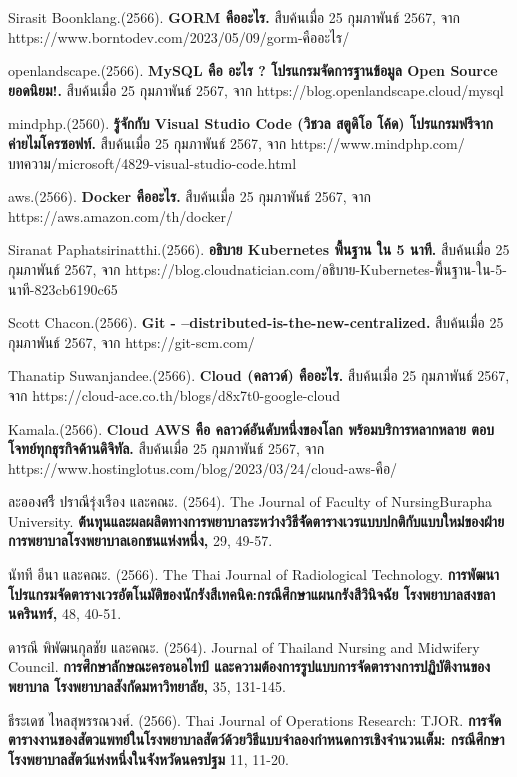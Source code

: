 \begin{thebibliography}{99}
Sirasit Boonklang.(2566). \textbf{GORM คืออะไร.} สืบค้นเมื่อ 25 กุมภาพันธ์ 2567, จาก https://www.borntodev.com/2023/05/09/gorm-คืออะไร/

openlandscape.(2566). \textbf{MySQL คือ อะไร ? โปรแกรมจัดการฐานข้อมูล Open Source ยอดนิยม!.} สืบค้นเมื่อ 25 กุมภาพันธ์ 2567, จาก https://blog.openlandscape.cloud/mysql


mindphp.(2560). \textbf{รู้จักกับ Visual Studio Code (วิชวล สตูดิโอ โค้ด) โปรแกรมฟรีจากค่ายไมโครซอฟท์.} สืบค้นเมื่อ 25 กุมภาพันธ์ 2567, จาก https://www.mindphp.com/บทความ/microsoft/4829-visual-studio-code.html

aws.(2566). \textbf{Docker คืออะไร.} สืบค้นเมื่อ 25 กุมภาพันธ์ 2567, จาก https://aws.amazon.com/th/docker/

Siranat Paphatsirinatthi.(2566). \textbf{อธิบาย Kubernetes พื้นฐาน ใน 5 นาที.} สืบค้นเมื่อ 25 กุมภาพันธ์ 2567, จาก https://blog.cloudnatician.com/อธิบาย-Kubernetes-พื้นฐาน-ใน-5-นาที-823cb6190c65

Scott Chacon.(2566). \textbf{Git - --distributed-is-the-new-centralized.} สืบค้นเมื่อ 25 กุมภาพันธ์ 2567, จาก https://git-scm.com/

Thanatip Suwanjandee.(2566). \textbf{Cloud (คลาวด์) คืออะไร.} สืบค้นเมื่อ 25 กุมภาพันธ์ 2567, จาก https://cloud-ace.co.th/blogs/d8x7t0-google-cloud

Kamala.(2566). \textbf{Cloud AWS คือ คลาวด์อันดับหนึ่งของโลก พร้อมบริการหลากหลาย ตอบโจทย์ทุกธุรกิจด้านดิจิทัล.} สืบค้นเมื่อ 25 กุมภาพันธ์ 2567, จาก https://www.hostinglotus.com/blog/2023/03/24/cloud-aws-คือ/

ละอองศรีี ปราณีรุ่งเรือง และคณะ. (2564). The Journal of Faculty of NursingBurapha University. \textbf{ต้้นทุุนและผลผลิตทางการพยาบาลระหว่่างวิธีจััดตารางเวรแบบปกติกับแบบใหม่่ของฝ่ายการพยาบาลโรงพยาบาลเอกชนแห่งหนึ่ง,} 29, 49-57.

นัทที อีนา และคณะ. (2566). The Thai Journal of Radiological Technology. \textbf{การพัฒนาโปรแกรมจัดตารางเวรอัตโนมัติของนักรังสีเทคนิค:กรณีศึกษาแผนกรังสีวินิจฉัย โรงพยาบาลสงขลานครินทร์,} 48, 40-51.


ดารณี พิพัฒนกุลชัย และคณะ. (2564). Journal of Thailand Nursing and Midwifery Council. \textbf{การศึกษาลักษณะครอนอไทป์ และความต้องการรูปแบบการจัดตารางการปฏิบัติงานของพยาบาล  โรงพยาบาลสังกัดมหาวิทยาลัย,} 35, 131-145.


ธีระเดช ไหลสุพรรณวงศ์. (2566). Thai Journal of Operations Research: TJOR. \textbf{การจัดตารางงานของสัตวแพทย์ในโรงพยาบาลสัตว์ด้วยวิธีแบบจําลองกําหนดการเชิงจํานวนเต็ม: กรณีศึกษาโรงพยาบาลสัตว์แห่งหนึ่งในจังหวัดนครปฐม} 11, 11-20.


\end{thebibliography}
